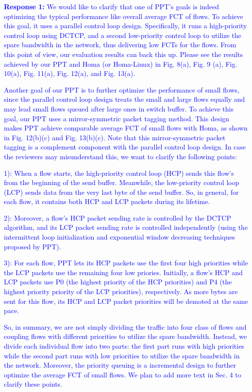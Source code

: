 \documentclass[12pt,one-column]{article}
\begin{document}
\noindent\textcolor{blue}{\textbf{Response 1:} 
We would like to clarify that one of PPT's goals is indeed optimizing the typical performance like overall average FCT of flows. To achieve this goal, it uses a parallel control loop design. Specifically, it runs a high-priority control loop using DCTCP, and a second low-priority control loop to utilize the spare bandwidth in the network, thus delivering low FCTs for the flows. 
From this point of view, our evaluation results can back this up. Please see the results achieved by our PPT and Homa (or Homa-Linux) in Fig. 8(a), Fig. 9 (a), Fig. 10(a), Fig. 11(a), Fig. 12(a), and Fig. 13(a). }

\textcolor{blue}{Another goal of our PPT is to further optimize the performance of small flows, since the parallel control loop design treats the small and large flows equally and may lead small flows queued after large ones in switch buffer. To achieve this goal, our PPT uses a mirror-symmetric packet tagging method. This design makes PPT achieve comparable average FCT of small flows with Homa, as shown in Fig. 12(b)(c) and Fig. 13(b)(c). Note that this mirror-symmetric packet tagging is a complement component with the parallel control loop design. In case the reviewers may misunderstand this, we want to clarify the following points:}

\textcolor{blue}{1): When a flow starts, the high-priority control loop (HCP) sends this flow's from the beginning of the send buffer. Meanwhile, the low-priority control loop (LCP) sends data from the very last byte of the send buffer. So, in general, for each flow, it contains both HCP and LCP packets during its lifetime. }

\textcolor{blue}{2): Moreover, a flow's HCP packet sending rate is controlled by the DCTCP algorithm, and its LCP packet sending rate is controlled independently (using the intermittent loop initialization and exponential window decreasing techniques proposed by PPT). 
}

\textcolor{blue}{3): For each flow, PPT lets its HCP packets use the first four high priorities while the LCP packets use the remaining four low priories. Initially, a flow's HCP and LCP packets use  P0 (the highest priority of the HCP priorities) and P4 (the highest priority priority of the LCP priorities), respectively. As more bytes are sent for this flow, its HCP and LCP packet priorities will be demoted at the same pace.
}

\textcolor{blue}{So, in summary, we are not simply dividing the traffic into four class of flows and coupling flows with different priorities to utilize the spare bandwidth. Instead, we divide each individual flow into two parts: the first part runs with high priorities while the second part runs with low priorities to utilize the spare bandwidth in the network. Moreover, the priority queuing is a incremental design to further optimize the average FCT of small flows. We plan to add more text in Sec. 4 to clarify these points.
}
\end{document}
